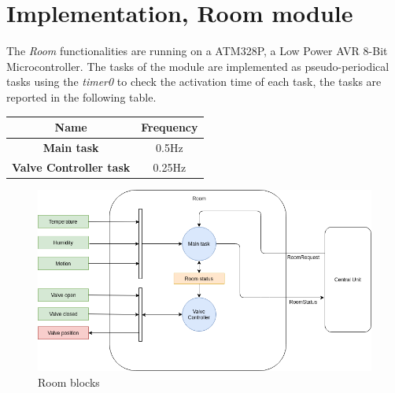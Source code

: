 \section{Implementation, Room module}
The \textit{Room} functionalities are running on a ATM328P, a Low Power AVR 8-Bit Microcontroller.
The tasks of the module are implemented as pseudo-periodical tasks using the \textit{timer0} 
to check the activation time of each task, the tasks are reported in the following table.

\begin{center}
	\begin{tabular}{||c | c ||} 
		\hline
		Name 	& Frequency \\ 
		\hline
		\textbf{Main task}			&	0.5Hz \\ 
		\hline
		\textbf{Valve Controller task}	&	0.25Hz \\ 
		\hline
	\end{tabular}
\end{center}

\begin{figure}[h]
	\centering
	\includegraphics[width=12cm,keepaspectratio]{img/Room_description}
	\caption{Room blocks}
	\label{fig:room_description}
\end{figure}

